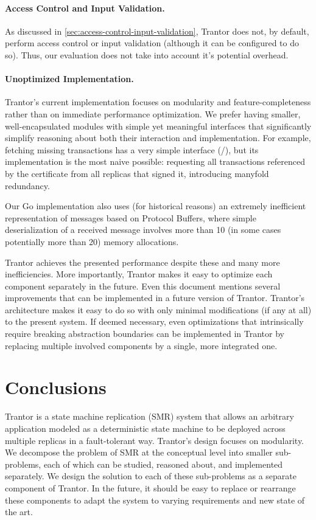 \documentclass{article}
\begin{document}
\paragraph{Access Control and Input Validation.}
As discussed in \cref{sec:access-control-input-validation}, Trantor does not, by default, perform access control or input validation
(although it can be configured to do so).
Thus, our evaluation does not take into account it's potential overhead.

\paragraph{Unoptimized Implementation.}
Trantor's current implementation focuses on modularity and feature-completeness rather than on immediate performance optimization.
We prefer having smaller, well-encapsulated modules with simple yet meaningful interfaces
that significantly simplify reasoning about both their interaction and implementation.
For example, fetching missing transactions has a very simple interface (/),
but its implementation is the most naive possible: requesting all transactions referenced by the certificate from all replicas that signed it,
introducing manyfold redundancy.

Our Go implementation also uses (for historical reasons) an extremely inefficient representation of messages based on Protocol Buffers,
where simple deserialization of a received message involves more than 10 (in some cases potentially more than 20) memory allocations.

Trantor achieves the presented performance despite these and many more inefficiencies.
More importantly, Trantor makes it easy to optimize each component separately in the future.
Even this document mentions several improvements that can be implemented in a future version of Trantor.
Trantor's architecture makes it easy to do so with only minimal modifications (if any at all) to the present system.
If deemed necessary, even optimizations that intrinsically require breaking abstraction boundaries
can be implemented in Trantor by replacing multiple involved components by a single, more integrated one.

\section{Conclusions}
\label{sec:conclusions}

Trantor is a state machine replication (SMR) system that allows an arbitrary application modeled as a deterministic state machine
to be deployed across multiple replicas in a fault-tolerant way.
Trantor’s design focuses on modularity.
We decompose the problem of SMR at the conceptual level into smaller sub-problems, each of which can be studied, reasoned about, and implemented separately.
We design the solution to each of these sub-problems as a separate component of Trantor.
In the future, it should be easy to replace or rearrange these components to adapt the system to varying requirements and new state of the art.
\end{document}
